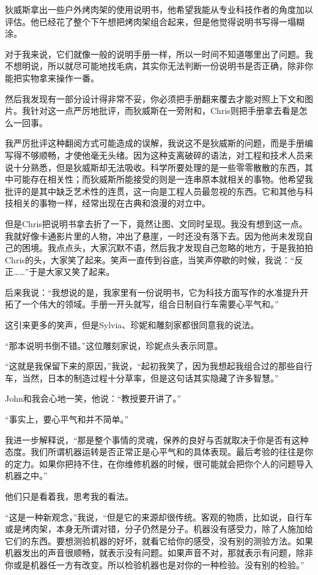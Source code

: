 \documentclass[UTF8]{article}
\begin{document}
\par 狄威斯拿出一些户外烤肉架的使用说明书，他希望我能从专业科技作者的角度加以评估。他已经花了整个下午想把烤肉架组合起来，但是他觉得说明书写得一塌糊涂。
\par 对于我来说，它们就像一般的说明手册一样，所以一时间不知道哪里出了问题。我不想明说，所以就尽可能地找毛病，其实你无法判断一份说明书是否正确，除非你能把实物拿来操作一番。
\par 然后我发现有一部分设计得非常不妥，你必须把手册翻来覆去才能对照上下文和图片。我针对这一点严厉地批评，而狄威斯在一旁附和，Chris则把手册拿去看是怎么一回事。
\par 我严厉批评这种翻阅方式可能造成的误解，我说这不是狄威斯的问题，而是手册编写得不够顺畅，才使他毫无头绪。因为这种支离破碎的语法，对工程和技术人员来说十分熟悉，但是狄威斯却无法吸收。科学所要处理的是一些零零散散的东西，其中可能存在相关性；而狄威斯所能接受的则是一连串原本就相关的事物。他希望我批评的是其中缺乏艺术性的连贯，这一向是工程人员最忽视的东西。它和其他与科技相关的事物一样，经常出现在古典和浪漫的对立中。
\par 但是Chris把说明书拿去折了一下，竟然让图、文同时呈现。我没有想到这一点。我就好像卡通影片里的人物，冲出了悬崖，一时还没有落下去。因为他尚未发现自己的困境。我点点头，大家沉默不语，然后我才发现自己忽略的地方，于是我拍拍Chris的头，大家笑了起来。笑声一直传到谷底，当笑声停歇的时候，我说：“反正……”于是大家又笑了起来。
\par 后来我说：“我想说的是，我家里有一份说明书，它为科技方面写作的水准提升开拓了一个伟大的领域。手册一开头就写，组合日制自行车需要心平气和。”
\par 这引来更多的笑声，但是Sylvia、珍妮和雕刻家都很同意我的说法。
\par “那本说明书倒不错。”这位雕刻家说，珍妮点头表示同意。
\par “这就是我保留下来的原因，”我说，“起初我笑了，因为我想起我组合过的那些自行车，当然，日本的制造过程十分草率，但是这句话其实隐藏了许多智慧。”
\par John和我会心地一笑，他说：“教授要开讲了。”
\par “事实上，要心平气和并不简单。”
\par 我进一步解释说，“那是整个事情的灵魂，保养的良好与否就取决于你是否有这种态度。我们所谓机器运转是否正常正是心平气和的具体表现。最后考验的往往是你的定力。如果你把持不住，在你维修机器的时候，很可能就会把你个人的问题导入机器之中。”
\par 他们只是看着我，思考我的看法。
\par “这是一种新观念，”我说，“但是它的来源却很传统。客观的物质，比如说，自行车或是烤肉架，本身无所谓对错，分子仍然是分子。机器没有感受力，除了人施加给它们的东西。要想测验机器的好坏，就看它给你的感受，没有别的测验方法。如果机器发出的声音很顺畅，就表示没有问题。如果声音不对，那就表示有问题，除非你或是机器任一方有改变。所以检验机器也是对你的一种检验。没有别的检验。”
\end{document}
